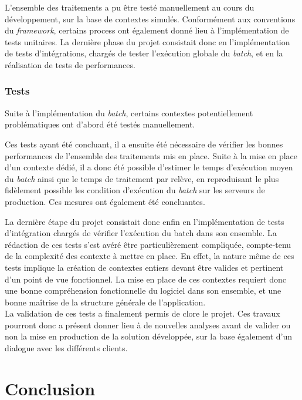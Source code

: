 \documentclass[a4paper, 12pt]{report}
\begin{document}
L'ensemble des traitements a pu être testé manuellement au cours du développement, sur la base de contextes simulés. Conformément aux conventions du \textit{framework}, certains process ont également donné lieu à l'implémentation de tests unitaires. La dernière phase du projet consistait donc en l'implémentation de tests d'intégrations, chargés de tester l'exécution globale du \textit{batch}, et en la réalisation de tests de performances.

\subsection{Tests}

Suite à l'implémentation du \textit{batch}, certains contextes potentiellement problématiques ont d'abord été testés manuellement. 

Ces tests ayant été concluant, il a ensuite été nécessaire de vérifier les bonnes performances de l'ensemble des traitements mis en place. Suite à la mise en place d'un contexte dédié, il a donc été possible d'estimer le temps d'exécution moyen du \textit{batch} ainsi que le temps de traitement par relève, en reproduisant le plus fidèlement possible les condition d'exécution du \textit{batch} sur les serveurs de production. Ces mesures ont également été concluantes.

La dernière étape du projet consistait donc enfin en l'implémentation de tests d'intégration chargés de vérifier l'exécution du batch dans son ensemble. La rédaction de ces tests s'est avéré être particulièrement compliquée, compte-tenu de la complexité des contexte à mettre en place. En effet, la nature même de ces tests implique la création de contextes entiers devant être valides et pertinent d'un point de vue fonctionnel. La mise en place de ces contextes requiert donc une bonne compréhension fonctionnelle du logiciel dans son ensemble, et une bonne maîtrise de la structure générale de l'application.\\

La validation de ces tests a finalement permis de clore le projet. Ces travaux pourront donc a présent donner lieu à de nouvelles analyses avant de valider ou non la mise en production de la solution développée, sur la base également d'un dialogue avec les différents clients.

\chapter*{Conclusion}
\end{document}
